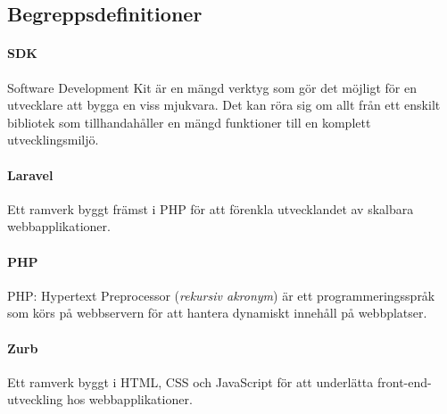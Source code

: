 \subsection{Begreppsdefinitioner}

\paragraph{SDK} Software Development Kit är en mängd verktyg som gör det möjligt för en utvecklare att bygga en viss mjukvara. Det kan röra sig om allt från ett enskilt bibliotek som tillhandahåller en mängd funktioner till en komplett utvecklingsmiljö.

\paragraph{Laravel} Ett ramverk byggt främst i PHP för att förenkla utvecklandet av skalbara webbapplikationer\parencite{laravel}.

\paragraph{PHP} PHP: Hypertext Preprocessor (\textit{rekursiv akronym}) är ett programmeringsspråk som körs på webbservern för att hantera dynamiskt innehåll på webbplatser.

\paragraph{Zurb} Ett ramverk byggt i HTML, CSS och JavaScript för att underlätta front-end-utveckling hos webbapplikationer\parencite{zurb}.